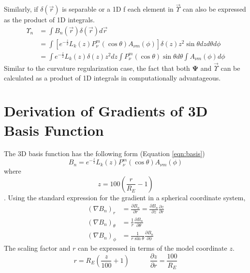 \documentclass[12pt,letterpaper]{article}
\newcommand{\mat}[1]{\mathbf{#1}}
\begin{document}
    Similarly, if \(\delta(\vec{r})\) is separable or a 1D f each element in \(\vec{\Upsilon}\) can also be expressed as the product of 1D integrals.
    \begin{align}
      \Upsilon_{n} &= \int B_n(\vec{r})\delta(\vec{r}) d\vec{r} \\
      &= \int \left[e^{-\frac{z}{2}}L_k(z)P_\nu^m(\cos\theta)A_{\nu m}(\phi)\right]\delta(z) z^2 \sin\theta dz d\theta d\phi \\
      &= \int e^{-\frac{z}{2}}L_k(z)\delta(z)z^2 dz \int P_\nu^m(\cos\theta)\sin\theta d\theta \int A_{\nu m}(\phi) d\phi
    \end{align}
    Similar to the curvature regularization case, the fact that both \(\mat{\Psi}\) and \(\vec{\Upsilon}\) can be calculated as a product of 1D integrals in computationally advantageous.




\appendix

\section{Derivation of Gradients of 3D Basis Function}
  \label{app:gradients}
  The 3D basis function has the following form (Equation \ref{eqn:basis})
  \begin{equation}
    B_n = e^{-\frac{z}{2}}L_k(z)P_\nu^m(\cos\theta)A_{\nu m}(\phi)
  \end{equation}
  where
  \begin{equation}
    z = 100\left(\frac{r}{R_E}-1\right)
  \end{equation}.
  Using the standard expression for the gradient in a spherical coordinate system,
  \begin{align}
    (\nabla B_n)_r &= \frac{\partial B_n}{\partial r} = \frac{\partial B_n}{\partial z}\frac{\partial z}{\partial r} \\
    (\nabla B_n)_\theta &= \frac{1}{r}\frac{\partial B_n}{\partial \theta} \\
    (\nabla B_n)_\phi &= \frac{1}{r\sin\theta}\frac{\partial B_n}{\partial \phi}
  \end{align}
  The scaling factor and \(r\) can be expressed in terms of the model coordinate \(z\).
  \begin{equation}
    r = R_E\left(\frac{z}{100}+1\right) \quad\quad\quad \frac{\partial z}{\partial r} = \frac{100}{R_E}
  \end{equation}
\end{document}
